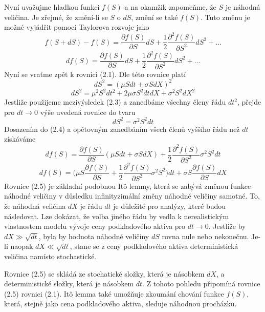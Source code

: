 \documentclass[a4paper]{book}
\begin{document}
Nyní uvažujme hladkou funkci $f(S)$ a na okamžik zapomeňme, že $S$ je náhodná veličina. Je zřejmé, že změní-li se $S$ o $dS$, změní se také $f(S)$. Tuto změnu je možné vyjádřit pomocí Taylorova rozvoje jako
\begin{equation*}
f(S + dS) - f(S) = \frac{\partial f(S)}{\partial S}dS + \frac{1}{2}\frac{\partial^2f(S)}{\partial S^2}dS^2 + ...
\end{equation*}
\begin{equation}
df(S) = \frac{\partial f(S)}{\partial S}dS + \frac{1}{2}\frac{\partial^2f(S)}{\partial S^2}dS^2 + ...
\end{equation}
Nyní se vraťme zpět k rovnici (2.1). Dle této rovnice platí
\begin{equation*}
dS^2 = (\mu Sdt + \sigma S dX)^2
\end{equation*}
\begin{equation*}
dS^2 = \mu^2S^2dt^2 + 2\mu \sigma S^2dtdX + \sigma^2 S^2 dX^2
\end{equation*}
Jestliže použijeme mezivýsledek (2.3) a zanedbáme všechny členy řádu $dt^2$, přejde pro $dt \rightarrow 0$ výše uvedená rovnice do tvaru
\begin{equation*}
dS^2 = \sigma^2 S^2 dt
\end{equation*}
Dosazením do (2.4) a opětovným zanedbáním všech členů vyššího řádu než $dt$ získáváme
\begin{equation*}
df(S) = \frac{\partial f(S)}{\partial S}(\mu S dt + \sigma S dX) + \frac{1}{2}\frac{\partial^2f(S)}{\partial S^2}\sigma^2 S^2 dt
\end{equation*}
\begin{equation}
df(S) = \Big( \mu S\frac{\partial f(S)}{\partial S} + \frac{1}{2}\frac{\partial^2f(S)}{\partial S^2}\sigma^2 S^2 \Big)dt + \sigma S\frac{\partial f(S)}{\partial S}dX
\end{equation}
Rovnice (2.5) je základní podobnou It\^o lemmy, která se zabývá změnou funkce náhodné veličiny v důsledku infinityzimální změny náhodné veličiny samotné. To, že náhodná veličina $dX$ je řádu $dt$ je důležité pro analýzy, které budou následovat. Lze dokázat, že volba jiného řádu by vedla k nerealistickým vlastnostem modelu vývoje ceny podkladového aktiva pro $dt \rightarrow 0$. Jestliže by $dX \gg \sqrt{dt}$, byla by hodnota náhodné veličiny $dS$ rovna nule nebo nekonečnu. Je-li naopak $dX \ll \sqrt{dt}$, stane se z ceny podkladového aktiva deterministická veličina namísto stochastické.

Rovnice (2.5) se skládá ze stochatické složky, která je násobkem $dX$, a deterministické složky, která je násobkem $dt$. Z tohoto pohledu připomíná rovnice (2.5) rovnici (2.1). It\^o lemma také umožňuje zkoumání chování funkce $f(S)$, která, stejně jako cena podkladového aktiva, sleduje náhodnou procházku.
\end{document}
